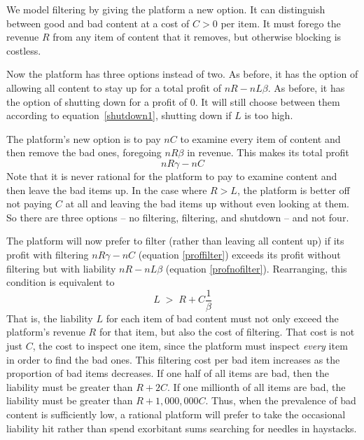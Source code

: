 \documentclass{article}
\begin{document}
We model filtering by giving the platform a new option. It can distinguish between good and bad content at a cost of $C > 0$ per item. It must forego the revenue $R$ from any item of content that it removes, but otherwise blocking is costless. 

Now the platform has three options instead of two. As before, it has the option of allowing all content to stay up for a total profit of $nR - nL\beta$. As before, it has the option of shutting down for a profit of $0$. It will still choose between them according to equation~\ref{shutdown1}, shutting down if $L$ is too high.

The platform's new option is to pay $nC$ to examine every item of content and then remove the bad ones, foregoing $nR\beta$ in revenue. This makes its total profit
\begin{equation}
\label{proffilter}
nR\gamma - nC    
\end{equation}
Note that it is never rational for the platform to pay to examine content and then leave the bad items up. In the case where $R > L$, the platform is better off not paying $C$ at all and leaving the bad items up without even looking at them. So there are three options -- no filtering, filtering, and shutdown -- and not four.

The platform will now prefer to filter (rather than leaving all content up) if its profit with filtering $nR\gamma - nC$ (equation \ref{proffilter}) exceeds its profit without filtering but with liability $nR - nL\beta$ (equation \ref{profnofilter}). Rearranging, this condition is equivalent to 
\begin{equation*}
\label{dofilter}
L \;>\; R + C\frac{1}{\beta}
\end{equation*}
That is, the liability $L$ for each item of bad content must not only exceed the platform's revenue $R$ for that item, but also the cost of filtering. That cost is not just $C$, the cost to inspect one item, since the platform must inspect \emph{every} item in order to find the bad ones. This filtering cost per bad item increases as the proportion of bad items decreases. If one half of all items are bad, then the  liability must be greater than $R + 2C$. If one millionth of all items are bad, the liability must be greater than $R + 1,000,000C$. Thus, when the prevalence of bad content is sufficiently low, a rational platform  will prefer to take the occasional liability hit rather than spend exorbitant sums searching for needles in haystacks.
\end{document}
